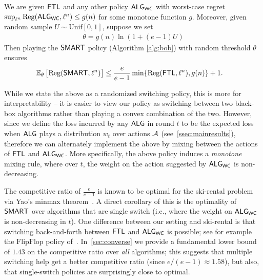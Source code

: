 \begin{theorem}  
\label{thm:SkiRentalRegret}
We are given $\mathsf{FTL}$ and any other policy $\mathsf{ALG}_{\mathsf{WC}}$ with worst-case regret $\sup_{\ell^n} \mathrm{Reg}(\mathsf{ALG}_{\mathsf{WC}}, \ell^n) \le g(n)$
for some monotone function $g$. 
Moreover, given random sample $U\sim\text{Unif}[0,1]$, suppose we set
      \begin{align*}
      \theta=g(n)\ln(1+(e-1)U)
      \end{align*}
      Then playing the $\mathsf{SMART}$ policy (Algorithm \ref{alg:bob}) with random threshold $\theta$ ensures 
    \begin{align*} 
        \operatorname{\mathbb{E}}_{\theta}&\left[\mathrm{Reg}(\mathsf{SMART}, \ell^n)\right]
        \le \frac{e}{e-1} \min\{\mathrm{Reg}(\mathsf{FTL},\ell^n),g(n)\} + 1.
    \end{align*}
\end{theorem}
While we state the above as a randomized switching policy, this is more for interpretability -- it is easier to view our policy as switching between two black-box algorithms rather than playing a convex combination of the two. However, since we define the loss incurred by any $\mathsf{ALG}$ in round $t$ to be the expected loss when $\mathsf{ALG}$ plays a distribution $w_t$ over actions $\mathcal{A}$ (see~\cref{ssec:mainresults}), therefore we can alternately implement the above by mixing between the actions of $\mathsf{FTL}$ and $\mathsf{ALG}_{\mathsf{WC}}$. More specifically, the above policy induces a \emph{monotone} mixing rule, where over $t$, the weight on the action suggested by $\mathsf{ALG}_{\mathsf{WC}}$ is non-decreasing.

\begin{remark} 
\label{rem:SkiRentalLB}
The competitive ratio of $\frac{e}{e-1}$ is known to be optimal for the ski-rental problem via Yao's minmax theorem~\citep{borodin2005online}. A direct corollary of this is the optimality of $\mathsf{SMART}$ over algorithms that are single switch (i.e., where the weight on $\mathsf{ALG}_{\mathsf{WC}}$ is non-decreasing in $t$). One difference between our setting and ski-rental is that switching back-and-forth between $\mathsf{FTL}$ and $\mathsf{ALG}_{\mathsf{WC}}$ is possible; see for example the $\text{FlipFlop}$ policy of~\cite{de2014follow}. In~\cref{sec:converse} we provide a fundamental lower bound of $1.43$ on the competitive ratio over \emph{all} algorithms; this suggests that multiple switching  help get a better competitive ratio (since $e/(e-1)\approx 1.58$), but also, that single-switch policies are surprisingly close to optimal.
\end{remark}

